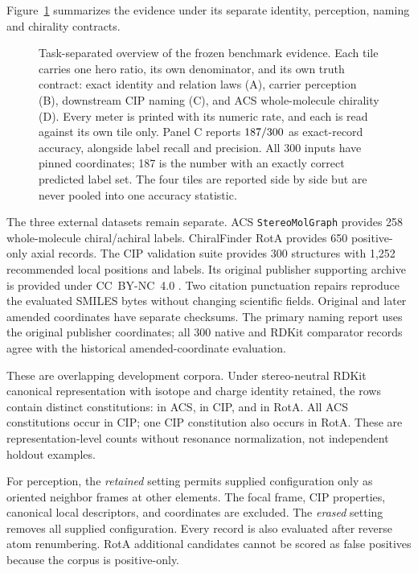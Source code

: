 \documentclass[pdflatex,sn-mathphys-num,referee,lineno]{sn-jnl}
\newcommand{\stereomolgraph}{\texttt{StereoMolGraph}\xspace}
\theoremstyle{plain}
\theoremstyle{remark}
\theoremstyle{definition}
\begin{document}
Figure~\ref{fig:benchmark-evidence-map} summarizes the evidence under its
separate identity, perception, naming and chirality contracts.
\begin{figure}[htbp]
  \centering
  \resizebox{0.96\textwidth}{!}{}
  \caption{Task-separated overview of the frozen benchmark evidence.  Each tile
  carries one hero ratio, its own denominator, and its own truth contract:
  exact identity and relation laws (A), carrier perception (B), downstream CIP
  naming (C), and ACS whole-molecule chirality (D).  Every meter is printed
  with its numeric rate, and each is read against its own tile only.  Panel C
  reports \(187/300\) as exact-record
  accuracy, alongside label recall and precision. All 300 inputs have pinned
  coordinates; 187 is the number with an exactly correct predicted label set.
  The four tiles are reported side by side but are never pooled into one
  accuracy statistic.}
  \label{fig:benchmark-evidence-map}
\end{figure}

The three external datasets remain separate.  ACS \stereomolgraph provides 258
whole-molecule chiral/achiral labels.  ChiralFinder RotA provides 650
positive-only axial records.  The CIP validation suite provides 300 structures
with 1,252 recommended local positions and labels. Its original publisher
supporting archive is provided under CC~BY-NC~4.0 \cite{hanson2018cip}.
Two citation punctuation repairs reproduce the evaluated SMILES bytes without
changing scientific fields. Original and later amended coordinates have
separate checksums. The primary naming report uses the original publisher
coordinates; all 300 native and RDKit comparator records agree with the
historical amended-coordinate evaluation.

These are overlapping development corpora. Under stereo-neutral RDKit
canonical representation with isotope and charge identity retained, the
\DevelopmentRows{} rows contain \DevelopmentConstitutions{} distinct
constitutions: \AcsConstitutions{} in ACS, \CipConstitutions{} in CIP, and
\RotAConstitutions{} in RotA. All \AcsCipOverlap{} ACS constitutions occur
in CIP; one CIP constitution also occurs in RotA. These are representation-level
counts without resonance normalization, not independent holdout examples.

For perception, the \emph{retained} setting permits supplied configuration only
as oriented neighbor frames at other elements.  The focal frame, CIP
properties, canonical local descriptors, and coordinates are excluded.  The
\emph{erased} setting removes all supplied configuration.  Every record is
also evaluated after reverse atom renumbering.  RotA additional candidates
cannot be scored as false positives because the corpus is positive-only.
\end{document}
